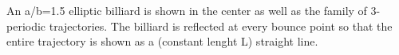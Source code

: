 An a/b=1.5 elliptic billiard is shown in the center as well as the family of 3-periodic trajectories. The billiard is reflected at every bounce point so that the entire trajectory is shown as a (constant lenght L) straight line.